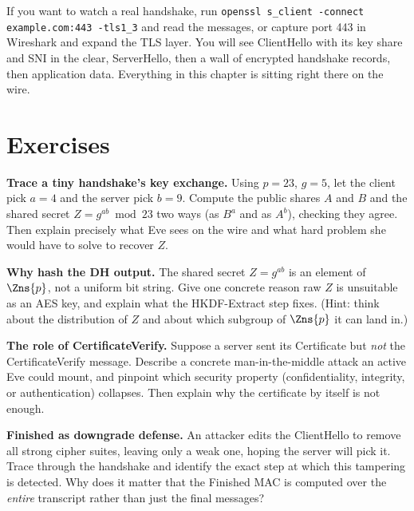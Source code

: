 \begin{marginnotebox}
If you want to watch a real handshake, run \texttt{openssl s\_client -connect
example.com:443 -tls1\_3} and read the messages, or capture port 443 in Wireshark
and expand the TLS layer. You will see ClientHello with its key share and SNI in
the clear, ServerHello, then a wall of encrypted handshake records, then
application data. Everything in this chapter is sitting right there on the wire.
\end{marginnotebox}

\section{Exercises}

\begin{exercise}
\textbf{Trace a tiny handshake's key exchange.} Using $p = 23$, $g = 5$, let the
client pick $a = 4$ and the server pick $b = 9$. Compute the public shares $A$ and
$B$ and the shared secret $Z = g^{ab} \bmod 23$ two ways (as $B^a$ and as $A^b$),
checking they agree. Then explain precisely what Eve sees on the wire and what hard
problem she would have to solve to recover $Z$.
\end{exercise}

\begin{exercise}
\textbf{Why hash the DH output.} The shared secret $Z = g^{ab}$ is an element of
$\Zns{p}$, not a uniform bit string. Give one concrete reason raw $Z$ is unsuitable
as an AES key, and explain what the HKDF-Extract step fixes. (Hint: think about the
distribution of $Z$ and about which subgroup of $\Zns{p}$ it can land in.)
\end{exercise}

\begin{exercise}
\textbf{The role of CertificateVerify.} Suppose a server sent its Certificate but
\emph{not} the CertificateVerify message. Describe a concrete man-in-the-middle
attack an active Eve could mount, and pinpoint which security property
(confidentiality, integrity, or authentication) collapses. Then explain why the
certificate by itself is not enough.
\end{exercise}

\begin{exercise}
\textbf{Finished as downgrade defense.} An attacker edits the ClientHello to remove
all strong cipher suites, leaving only a weak one, hoping the server will pick it.
Trace through the handshake and identify the exact step at which this tampering is
detected. Why does it matter that the Finished MAC is computed over the
\emph{entire} transcript rather than just the final messages?
\end{exercise}

